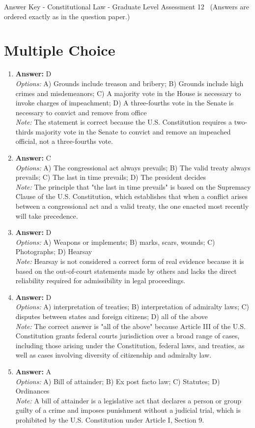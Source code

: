 \documentclass[12pt]{article}
\begin{document}
\begin{center}
Answer Key - Constitutional Law - Graduate Level Assessment 12 \
\small (Answers are ordered exactly as in the question paper.)
\end{center}

\section*{Multiple Choice}
\begin{enumerate}[label=\arabic*.]
\item \textbf{Answer:} D
\\ \textit{Options:} A) Grounds include treason and bribery; B) Grounds include high crimes and misdemeanors; C) A majority vote in the House is necessary to invoke charges of impeachment; D) A three-fourths vote in the Senate is necessary to convict and remove from office
\\ \textit{Note:} The statement is correct because the U.S. Constitution requires a two-thirds majority vote in the Senate to convict and remove an impeached official, not a three-fourths vote.
\item \textbf{Answer:} C
\\ \textit{Options:} A) The congressional act always prevails; B) The valid treaty always prevails; C) The last in time prevails; D) The president decides
\\ \textit{Note:} The principle that "the last in time prevails" is based on the Supremacy Clause of the U.S. Constitution, which establishes that when a conflict arises between a congressional act and a valid treaty, the one enacted most recently will take precedence.
\item \textbf{Answer:} D
\\ \textit{Options:} A) Weapons or implements; B) marks, scars, wounds; C) Photographs; D) Hearsay
\\ \textit{Note:} Hearsay is not considered a correct form of real evidence because it is based on the out-of-court statements made by others and lacks the direct reliability required for admissibility in legal proceedings.
\item \textbf{Answer:} D
\\ \textit{Options:} A) interpretation of treaties; B) interpretation of admiralty laws; C) disputes between states and foreign citizens; D) all of the above
\\ \textit{Note:} The correct answer is "all of the above" because Article III of the U.S. Constitution grants federal courts jurisdiction over a broad range of cases, including those arising under the Constitution, federal laws, and treaties, as well as cases involving diversity of citizenship and admiralty law.
\item \textbf{Answer:} A
\\ \textit{Options:} A) Bill of attainder; B) Ex post facto law; C) Statutes; D) Ordinances
\\ \textit{Note:} A bill of attainder is a legislative act that declares a person or group guilty of a crime and imposes punishment without a judicial trial, which is prohibited by the U.S. Constitution under Article I, Section 9.
\end{enumerate}
\end{document}
